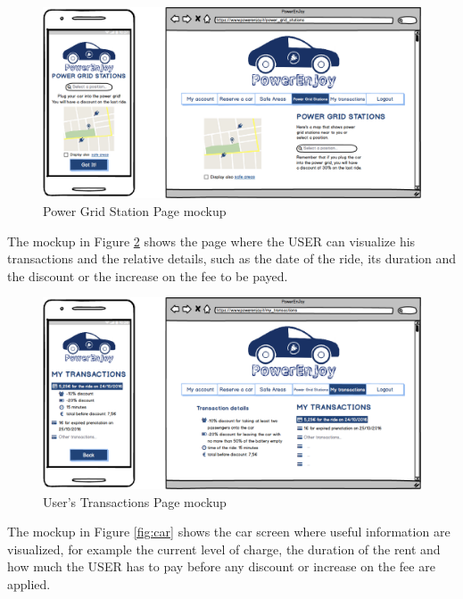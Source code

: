 \vspace{80pt}

\begin{figure}[htbp]
\centering
\includegraphics[width=\textwidth]{Images/Mockups/ChargePlaces}
\caption{Power Grid Station Page mockup}
\label{fig:power}
\end{figure}
\clearpage

\newline
The mockup in Figure \ref{fig:transactions} shows the page where the USER can visualize his transactions and the relative details, such as the date of the ride, its duration and the discount or the increase on the fee to be payed.

\vspace{80pt}

\begin{figure}[htbp]
\centering
\includegraphics[width=\textwidth]{Images/Mockups/MyTransactions}
\caption{User's Transactions Page mockup}
\label{fig:transactions}
\end{figure}
\clearpage

\newline
The mockup in Figure \ref{fig:car} shows the car screen where useful information are visualized, for example the current level of charge, the duration of the rent and how much the USER has to pay before any discount or increase on the fee are applied.

